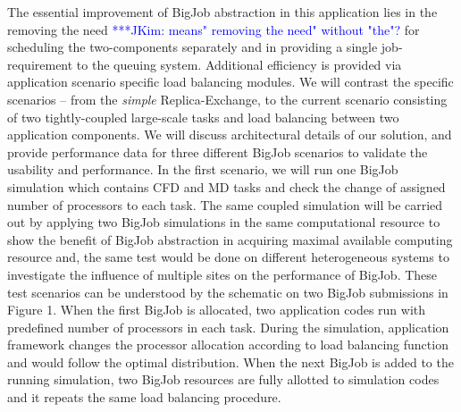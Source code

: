 \documentclass[a4paper]{article}
\newcommand{\jkimnote}[1]{ {\textcolor{blue} { ***JKim: #1 }}}
\begin{document}
The essential improvement of BigJob abstraction in this application lies in the removing the need\jkimnote{means" removing the need" without "the"?} for scheduling the two-components separately and in providing a single job-requirement to the queuing system. Additional efficiency is provided via application scenario specific load balancing modules.  We will contrast the specific scenarios -- from the {\it simple} Replica-Exchange, %
to the current scenario consisting of two tightly-coupled large-scale tasks and load balancing between two application components. %
We will discuss architectural details of our solution, and provide performance data for three different BigJob scenarios to validate the usability and performance. In the first scenario, we will run one BigJob simulation which contains CFD and MD tasks and check the change of assigned number of processors to each task.  The same coupled simulation will be carried out by applying two BigJob simulations in the same computational resource to show the benefit of BigJob abstraction in acquiring maximal available computing resource and, the same test would be done on different heterogeneous systems to investigate the influence of multiple sites on the performance of BigJob. These test scenarios can be understood by the schematic on two BigJob submissions in Figure 1. When the first BigJob is allocated, two application codes run with predefined number of processors in each task. During the simulation, application framework changes the processor allocation according to load balancing function and would follow the optimal distribution. When the next BigJob is added to the running simulation, two BigJob resources are fully allotted to simulation codes and it repeats the same load balancing procedure.

\vspace{12pt}
\end{document}
